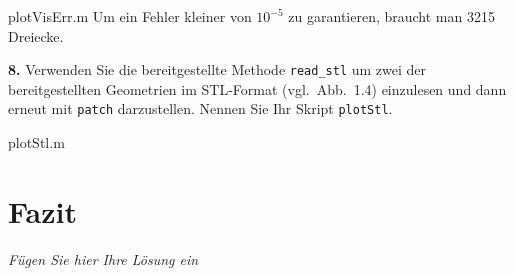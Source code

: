 \documentclass[Protokollheft.tex]{subfiles}
\begin{document}
 {plotVisErr.m}
Um ein Fehler kleiner von $10^{-5}$ zu garantieren, braucht man 3215 Dreiecke.

      \begin{framed}
	\noindent \textbf{8.} Verwenden Sie die bereitgestellte Methode \lstinline{read_stl} um zwei der bereitgestellten Geometrien im STL-Format (vgl.~Abb.~1.4) einzulesen und dann erneut mit \lstinline{patch} darzustellen.
                Nennen Sie Ihr Skript \lstinline{plotStl}.\label{exer:plotStl}
\end{framed}

 {plotStl.m}


\section{Fazit}
\emph{Fügen Sie hier Ihre Lösung ein}
\end{document}
